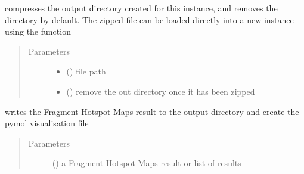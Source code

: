 \documentclass[letterpaper,10pt,english]{sphinxmanual}
\begin{document}
\begin{fulllineitems}
\begin{fulllineitems}
\end{fulllineitems}


\begin{fulllineitems}
\label{\detokenize{hs_io_api:hotspots.hs_io.HotspotWriter.compress}}
compresses the output directory created for this  instance, and
removes the directory by default. The zipped file can be loaded directly into a new
 instance using the
 function
\begin{quote}\begin{description}
\item[{Parameters}] \leavevmode\begin{itemize}
\item {} 
 () \textendash{} file path

\item {} 
 () \textendash{} remove the out directory once it has been zipped

\end{itemize}

\end{description}\end{quote}

\end{fulllineitems}


\begin{fulllineitems}
\label{\detokenize{hs_io_api:hotspots.hs_io.HotspotWriter.write}}
writes the Fragment Hotspot Maps result to the output directory and create the pymol visualisation file
\begin{quote}\begin{description}
\item[{Parameters}] \leavevmode
{} () \textendash{} a Fragment Hotspot Maps result or list of results


\end{description}
\end{quote}
\end{fulllineitems}
\end{fulllineitems}
\end{document}
